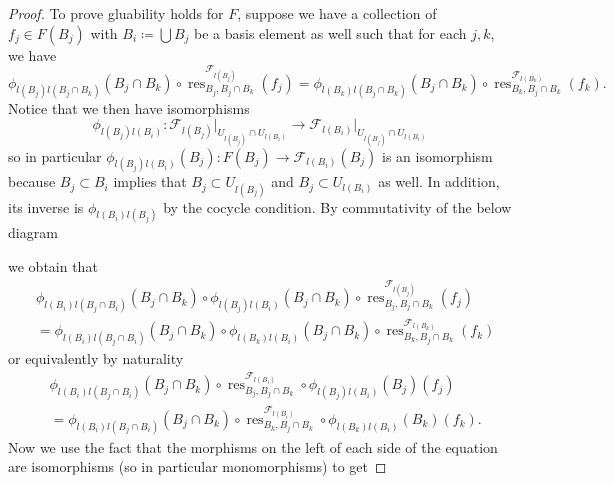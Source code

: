 \documentclass{article}
\newcommand{\fF}{\mathscr{F}}
\DeclareMathOperator{\res}{\mathrm{res}}
\begin{document}
\begin{proof}
    \vspace{0.1in}
    To prove gluability holds for $F$, suppose we have a collection of $f_j\in F(B_j)$ with $B_i\coloneqq \bigcup B_j$ be a basis element as well such that for each $j,k$, we have
    \[
    \phi_{l(B_j)l(B_j\cap B_k)}(B_j\cap B_k)\circ \res_{B_j,B_j\cap B_k}^{\fF_{l(B_j)}}(f_j)=\phi_{l(B_k)l(B_j\cap B_k)}(B_j\cap B_k)\circ \res_{B_k,B_j\cap B_k}^{\fF_{l(B_k)}}(f_k).
    \]
    Notice that we then have isomorphisms
    \[
    \phi_{l(B_j)l(B_i)}:\fF_{l(B_j)}\vert_{U_{l(B_j)}\cap U_{l(B_i)}}\to \fF_{l(B_i)}\vert_{U_{l(B_j)}\cap U_{l(B_i)}}
    \]
    so in particular $\phi_{l(B_j)l(B_i)}(B_j):F(B_j)\to \fF_{l(B_i)}(B_j)$ is an isomorphism because $B_j\subset B_i$ implies that $B_j\subset U_{l(B_j)}$ and $B_j\subset U_{l(B_i)}$ as well. In addition, its inverse is $\phi_{l(B_i) l(B_j)}$ by the cocycle condition. By commutativity of the below diagram
    \begin{center}
    \end{center}
        we obtain that
        \begin{align*}
            & \phi_{l(B_i)l(B_j\cap B_i)}(B_j\cap B_k)\circ\phi_{l(B_j)l(B_i)}(B_j\cap B_k)\circ \res_{B_j,B_j\cap B_k}^{\fF_{l(B_j)}}(f_j)\\
            &= \phi_{l(B_i)l(B_j\cap B_i)}(B_j\cap B_k)\circ\phi_{l(B_k)l(B_i)}(B_j\cap B_k)\circ \res_{B_k,B_j\cap B_k}^{\fF_{l(B_k)}}(f_k)
        \end{align*}
         or equivalently by naturality
         \begin{align*}
             & \phi_{l(B_i)l(B_j\cap B_i)}(B_j\cap B_k)\circ \res_{B_j,B_j\cap B_k}^{\fF_{l(B_i)}}\circ\phi_{l(B_j)l(B_i)}(B_j)(f_j)\\
            &= \phi_{l(B_i)l(B_j\cap B_i)}(B_j\cap B_k)\circ \res_{B_k,B_j\cap B_k}^{\fF_{l(B_i)}}\circ \phi_{l(B_k)l(B_i)}(B_k)(f_k).
         \end{align*}
        Now we use the fact that the morphisms on the left of each side of the equation are isomorphisms (so in particular monomorphisms) to get

\end{proof}
\end{document}
